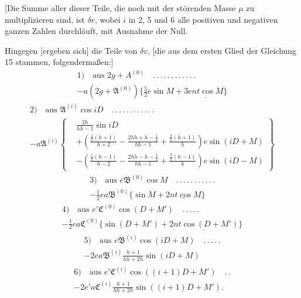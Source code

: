 [Die Summe aller dieser Teile, die noch mit der störenden Masse \(\mu\) zu multiplizieren sind, ist \(\delta r\), wobei \(i\) in 2, 5 und 6 alle positiven und negativen ganzen Zahlen durchläuft, mit Ausnahme der Null.

Hingegen [ergeben sich] die Teile von \(\delta v\), [die aus dem ersten Glied der Gleichung 15 stammen, folgendermaßen:]
\[
\begin{gathered}
1)\quad\text{aus }2g+A^{(0)}\quad .\, .\, .\, .\, .\, .\, .\, .\, .\, .\, .\, .\\[.5ex]
-a(2g+\mathfrak A^{(0)})\{\tfrac52e\sin M+\underline{3ent\cos M\}}
\end{gathered}
\]
\[
\begin{gathered}
2)\quad\text{aus }\mathfrak A^{(i)}\cos iD\quad .\, .\, .\, .\, .\, .\, .\, .\, .\, .\, .\, .\\[.5ex]
-a\mathfrak A^{(i)}\left\{\begin{aligned}
&\frac{2h}{hh-1}\sin iD\\
&+\left(\frac{\tfrac12(h+1)}{h+2}-\frac{2hh+h-\tfrac12}{hh-1}+\frac{\tfrac32(h+1)}h\right)e\sin(iD+M)\\
&-\left(\frac{\tfrac12(h-1)}{h-2}-\frac{2hh-h-\tfrac12}{hh-1}+\frac{\tfrac32(h-1)}h\right)e\sin(iD-M)
\end{aligned}\right\}
\end{gathered}
\]
\[
\begin{gathered}
3)\quad\text{aus }e\mathfrak B^{(0)}\cos M\quad .\, .\, .\, .\, .\, .\, .\, .\, .\, .\, .\\[.5ex]
-\tfrac12ea\mathfrak B^{(0)}\{\sin M+\underline{2nt\cos M}\}
\end{gathered}
\]
\[
\begin{gathered}
4)\quad\text{aus }e'\mathfrak C^{(0)}\cos(D+M')\quad .\, .\, .\, .\, .\\[.5ex]
-\tfrac12ea\mathfrak C^{(0)}\{\sin(D+M')+\underline{2nt\cos(D+M')}\}
\end{gathered}
\]
\[
\begin{gathered}
5)\quad\text{aus }e\mathfrak B^{(i)}\cos(iD+M)\quad .\, .\, .\, .\, .\\[.5ex]
-2ea\mathfrak B^{(i)}\frac{h+1}{hh+2h}\sin(iD+M)
\end{gathered}
\]
\[
\begin{gathered}
6)\quad\text{aus }e'\mathfrak C^{(i)}\cos((i+1)D+M')\quad .\, .\\[.5ex]
-2e'a\mathfrak C^{(i)}\frac{h+1}{hh+2h}\sin((i+1)D+M').
\end{gathered}
\]

